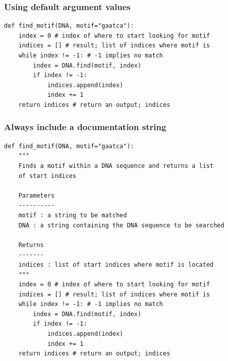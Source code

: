 \documentclass[xcolor=table]{beamer}
\begin{document}
\begin{frame}[fragile]
\frametitle{Using default argument values}

\begin{lstlisting}[style=python]
def find_motif(DNA, motif="gaatca"):
    index = 0 # index of where to start looking for motif
    indices = [] # result; list of indices where motif is
    while index != -1: # -1 implies no match
        index = DNA.find(motif, index)
        if index != -1:
            indices.append(index)
            index += 1
    return indices # return an output; indices
\end{lstlisting}

\end{frame}

\begin{frame}[fragile]
\frametitle{Always include a documentation string}

\begin{lstlisting}[style=python]
def find_motif(DNA, motif="gaatca"):
    """
    Finds a motif within a DNA sequence and returns a list 
    of start indices
    
    Parameters
    ----------
    motif : a string to be matched 
    DNA : a string containing the DNA sequence to be searched
    
    Returns
    -------
    indices : list of start indices where motif is located
    """
    index = 0 # index of where to start looking for motif
    indices = [] # result; list of indices where motif is
    while index != -1: # -1 implies no match
        index = DNA.find(motif, index)
        if index != -1:
            indices.append(index)
            index += 1
    return indices # return an output; indices
\end{lstlisting}

\end{frame}
\end{document}
